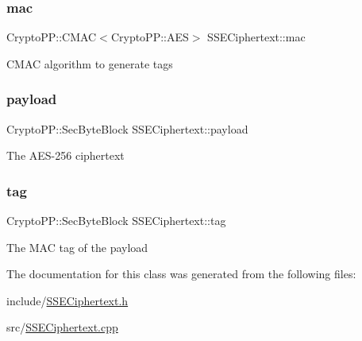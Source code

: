 \subsubsection{\texorpdfstring{mac}{mac}}
{\footnotesize\ttfamily Crypto\+P\+P\+::\+C\+M\+AC$<$Crypto\+P\+P\+::\+A\+ES$>$ S\+S\+E\+Ciphertext\+::mac\hspace{0.3cm}{\ttfamily [private]}}

C\+M\+AC algorithm to generate tags \mbox{\label{classSSECiphertext_a90eed1ea5ce709cac4d57eb9f7ba77aa}} 
\subsubsection{\texorpdfstring{payload}{payload}}
{\footnotesize\ttfamily Crypto\+P\+P\+::\+Sec\+Byte\+Block S\+S\+E\+Ciphertext\+::payload\hspace{0.3cm}{\ttfamily [private]}}

The A\+E\+S-\/256 ciphertext \mbox{\label{classSSECiphertext_a22682a68ecf569e219173c6955c4403e}} 
\subsubsection{\texorpdfstring{tag}{tag}}
{\footnotesize\ttfamily Crypto\+P\+P\+::\+Sec\+Byte\+Block S\+S\+E\+Ciphertext\+::tag\hspace{0.3cm}{\ttfamily [private]}}

The M\+AC tag of the {\ttfamily payload} 

The documentation for this class was generated from the following files\+:\begin{DoxyCompactItemize}
\item 
include/\hyperlink{SSECiphertext_8h}{S\+S\+E\+Ciphertext.\+h}\item 
src/\hyperlink{SSECiphertext_8cpp}{S\+S\+E\+Ciphertext.\+cpp}\end{DoxyCompactItemize}
